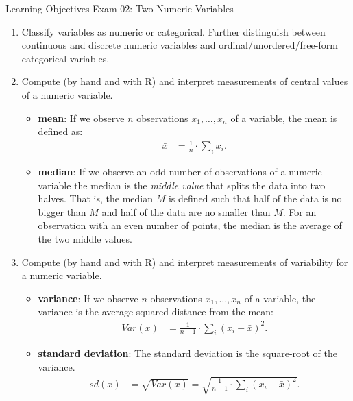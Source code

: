 \documentclass[11pt]{article}
\begin{document}
{\LARGE \textcolor{oiB}{Learning Objectives \hfill Exam 02: Two Numeric Variables}} \\

\begin{enumerate}
\renewcommand\labelenumi{\textcolor{light}{\textbf{LO \theenumi.}}}
\item Classify variables as numeric or categorical. Further distinguish
between continuous and discrete numeric variables and
ordinal/unordered/free-form categorical variables.

\item Compute (by hand and with R) and interpret measurements of central values
of a numeric variable.
\begin{itemize}
\renewcommand{\labelitemi}{{\textcolor{dark}{{\tiny $\blacksquare$}}}}
\item \textbf{mean}: If we observe $n$ observations $x_1, \ldots, x_n$ of a
variable, the mean is defined as:
\begin{align*}
\bar{x} &= \frac{1}{n} \cdot \sum_i x_i.
\end{align*}
\item \textbf{median}: If we observe an odd number of observations of a
numeric variable the median is the \textit{middle value} that splits the data
into two halves. That is, the median $M$ is defined such that half of the data
is no bigger than $M$ and half of the data are no smaller than $M$. For an
observation with an even number of points, the median is the average of the
two middle values.
\end{itemize}

\item Compute (by hand and with R) and interpret measurements of variability
for a numeric variable.
\begin{itemize}
\renewcommand{\labelitemi}{{\textcolor{dark}{{\tiny $\blacksquare$}}}}
\item \textbf{variance}: If we observe $n$ observations $x_1, \ldots, x_n$ of a
variable, the variance is the average squared distance from the mean:
\begin{align*}
Var(x) &= \frac{1}{n - 1} \cdot \sum_i (x_i - \bar{x})^2.
\end{align*}
\item \textbf{standard deviation}: The standard deviation is the square-root
of the variance.
\begin{align*}
sd(x) &= \sqrt{Var(x)} = \sqrt{\frac{1}{n - 1} \cdot \sum_i (x_i - \bar{x})^2}.
\end{align*}
\end{itemize}


\end{enumerate}
\end{document}
